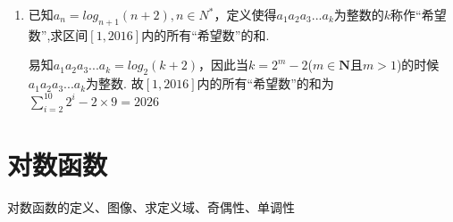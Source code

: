 \begin{enumerate}
\begin{jieda}
        为了消元，需要表示出$x^y$，故前式变形为$y+ln4 = log_xe$，进一步变形为$x^{y+ln4} = e$，因此$x^y = \dfrac{e}{x^{ln4}}$，将其代入原始方程组第一个式子有$\dfrac{e}{4} = \dfrac{e}{x^{ln4}} \cdot lnx$，即$x^{ln4} = 4lnx$，即$4^{lnx} = 4lnx$.\\
        令$t = lnx, t \in \mathbf{R}$，故$4^t = 4t$，解得$t = 1$或$2$. \\
        故$x = e, y = 1 - ln4$或$x = \sqrt{e}, y = 2 - ln4$
    \end{jieda}
    \item 已知$a_n = log_{n+1}(n+2), n \in N^*$，定义使得$a_1a_2a_3...a_k$为整数的$k$称作“希望数”,求区间$[1, 2016]$内的所有“希望数”的和.
    \begin{jieda}
        易知$a_1a_2a_3...a_k = log_2(k+2)$，因此当$k = 2^m - 2$($m \in \mathbf{N}$且$m > 1$)的时候$a_1a_2a_3...a_k$为整数.
        故$[1, 2016]$内的所有“希望数”的和为$\sum_{i = 2}^{10}2^{i} - 2 \times 9 = 2026$
    \end{jieda}
    
\end{enumerate}

\section*{对数函数}

\zsd 对数函数的定义、图像、求定义域、奇偶性、单调性


